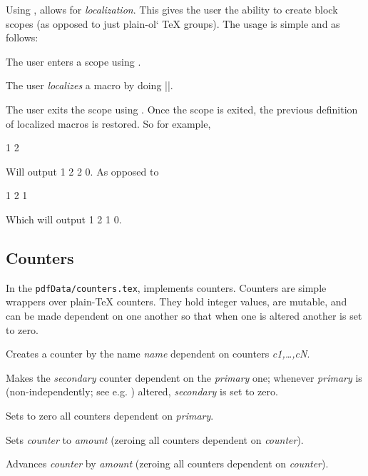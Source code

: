 Using , \pdftoolbox{} allows for {\it localization}.
This gives the user the ability to create block scopes (as opposed to just plain-ol` \TeX{} groups).
The usage is simple and as follows:
\benum
    \item The user enters a scope using \macro\beginscope.
    \item The user {\it localizes} a macro \macro\X{} by doing \inlinecode|\localize\X|.
    \item The user exits the scope using \macro\endscope.
    Once the scope is exited, the previous definition of localized macros is restored.
\eenum
So for example,

\beginhi \color{white}
\def\X{0}
\beginscope
    \localize\X
    \def\X{1}
    \X
    \beginscope
        \def\X{2}
        \X
    \endscope
    \X
\endscope
\X
\endhi

Will output 1 2 2 0.
As opposed to

\beginhi \color{white}
\def\X{0}
\bgroup
    \def\X{1}
    \X
    \bgroup
        \def\X{2}
        \X
    \egroup
    \X
\egroup
\X
\endhi

Which will output 1 2 1 0.

\subsection{Counters}

In the {\tt pdfData/counters.tex}, \pdftoolbox{} implements counters.
Counters are simple wrappers over plain-\TeX{} counters.
They hold integer values, are mutable, and can be made dependent on one another so that when one is altered another is set to zero.

Creates a counter by the name {\it name} dependent on counters {\it c1,\dots,cN}.
\emacroexp

Makes the {\it secondary} counter dependent on the {\it primary} one; whenever {\it primary} is (non-independently; see e.g. \gotomacro\seticounter) altered, {\it secondary} is set to zero.
\emacroexp

Sets to zero all counters dependent on {\it primary}.
\emacroexp

\macroexp{\setcounter {<counter>}{<amount>}}
Sets {\it counter} to {\it amount} (zeroing all counters dependent on {\it counter}).
\emacroexp

Advances {\it counter} by {\it amount} (zeroing all counters dependent on {\it counter}).
\emacroexp

